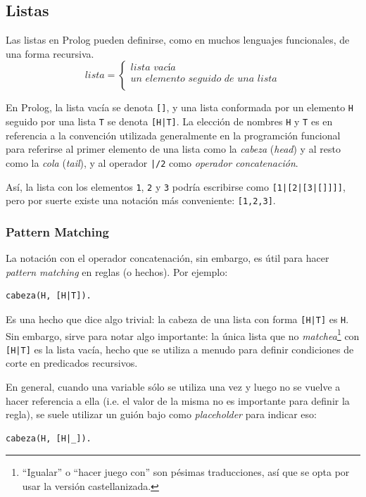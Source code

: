 \documentclass[12pt,titlepage]{article}
\begin{document}
\subsection{Listas}

Las listas en Prolog pueden definirse, como en muchos lenguajes funcionales, de una forma recursiva. 
\[
\textit{lista} = \left\{
  \begin{array}{l}
  \textit{lista vacía} \\
  \textit{un elemento seguido de una lista} \\
  \end{array} \right.
\]

En Prolog, la lista vacía se denota \lstinline|[]|, y una lista conformada por un elemento \lstinline|H| seguido por una lista \lstinline|T| se denota \lstinline$[H|T]$. La elección de nombres \lstinline|H| y \lstinline|T| es en referencia a la convención utilizada generalmente en la programción funcional para referirse al primer elemento de una lista como la \emph{cabeza} (\emph{head}) y al resto como la \emph{cola} (\emph{tail}), y al operador \lstinline$|/2$ como \emph{operador concatenación}. 

Así, la lista con los elementos \lstinline|1|, \lstinline|2| y \lstinline|3| podría escribirse como \lstinline$[1|[2|[3|[]]]]$, pero por suerte existe una notación más conveniente: \lstinline|[1,2,3]|.

\subsubsection*{Pattern Matching}

La notación con el operador concatenación, sin embargo, es útil para hacer \emph{pattern matching} en reglas (o hechos). Por ejemplo:
\begin{lstlisting}
cabeza(H, [H|T]).
\end{lstlisting}

Es una hecho que dice algo trivial: la cabeza de una lista con forma \lstinline$[H|T]$ es \lstinline|H|. Sin embargo, sirve para notar algo importante: la única lista que no \emph{matchea}\footnote{``Igualar'' o ``hacer juego con'' son pésimas traducciones, así que se opta por usar la versión castellanizada.} con \lstinline$[H|T]$ es la lista vacía, hecho que se utiliza a menudo para definir condiciones de corte en predicados recursivos.

En general, cuando una variable sólo se utiliza una vez y luego no se vuelve a hacer referencia a ella (i.e. el valor de la misma no es importante para definir la regla), se suele utilizar un guión bajo como \emph{placeholder} para indicar eso:
\begin{lstlisting}
cabeza(H, [H|_]).
\end{lstlisting}
\end{document}
